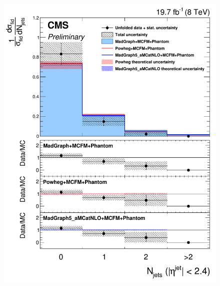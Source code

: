 \begin{figure}[hbtp]
\begin{center}
    \includegraphics[width=\cmsFigWidth]{Figures/DiffCrossSecZZTo2e2mCentralJets_Unfolded_fr_MadGraph_norm.png}       

\end{center}
\end{figure}
